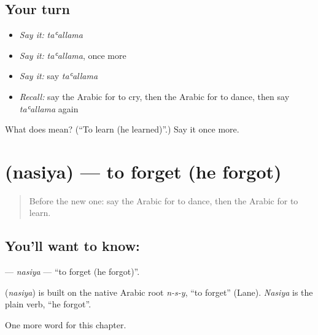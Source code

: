 \subsection*{Your turn}
\begin{itemize}
\raggedright
  \item \emph{Say it:} \emph{taʿallama}
  \item \emph{Say it:} \emph{taʿallama}, once more
  \item \emph{Say it:} say \emph{taʿallama}
  \item \emph{Recall:} say the Arabic for to cry, then the Arabic for to dance, then say \emph{taʿallama} again
\end{itemize}

\begin{tcolorbox}[breakable,colback=teal!4,colframe=teal!35!black,title={Before you move on}]
What does  mean? (\textquotedblleft{}To learn (he learned)\textquotedblright{}.) Say it once more.
\end{tcolorbox}
\section[\texorpdfstring{\ar{نسي} (nasiya)}{نسي (nasiya)}]{ (nasiya) — to forget (he forgot)}

\label{lesson:AR-C61-nasiya}



\begin{quote}
Before the new one: say the Arabic for to dance, then the Arabic for to learn.
\end{quote}

\subsection*{You'll want to know: }
\textbf{} — \emph{nasiya} — \textquotedblleft{}to forget (he forgot)\textquotedblright{}.

\begin{cousinweb}
\textbf{} (\emph{nasiya}) is built on the native Arabic root \emph{n-s-y}, \textquotedblleft{}to forget\textquotedblright{} (Lane). \emph{Nasiya} is the plain verb, \textquotedblleft{}he forgot\textquotedblright{}.
\end{cousinweb}

\begin{grammarlens}[title={What you've built}]
One more word for this chapter.
\end{grammarlens}

